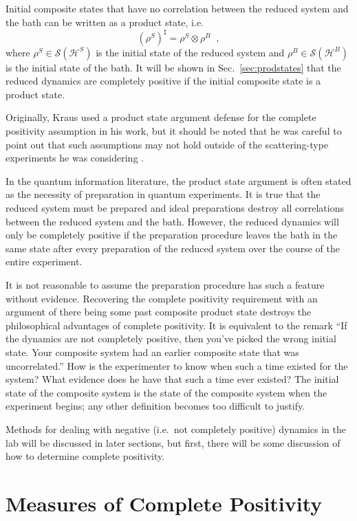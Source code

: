 Initial composite states that have no correlation between the reduced system and the bath can be written as a product state, i.e.\
\begin{equation*}
(\rho^S)^\sharp = \rho^S \otimes \rho^B\;\;,
\end{equation*}
where $\rho^S\in\mathcal{S}(\mathcal{H}^S)$ is the initial state of the reduced system and $\rho^B\in\mathcal{S}(\mathcal{H}^B)$ is the initial state of the bath.  It will be shown in Sec.\ \ref{sec:prodstates} that the reduced dynamics are completely positive if the initial composite state is a product state.  

Originally, Kraus used a product state argument defense for the complete positivity assumption in his work, but it should be noted that he was careful to point out that such assumptions may not hold outside of the scattering-type experiments he was considering \cite{Kraus1983}.  

In the quantum information literature, the product state argument is often stated as the necessity of preparation in quantum experiments.  It is true that the reduced system must be prepared and ideal preparations destroy all correlations between the reduced system and the bath.  However, the reduced dynamics will only be completely positive if the preparation procedure leaves the bath in the same state after every preparation of the reduced system over the course of the entire experiment.  

It is not reasonable to assume the preparation procedure has such a feature without evidence.  Recovering the complete positivity requirement with an argument of there being some past composite product state destroys the philosophical advantages of complete positivity. It is equivalent to the remark ``If the dynamics are not completely positive, then you've picked the wrong initial state. Your composite system had an earlier composite state that was uncorrelated.''  How is the experimenter to know when such a time existed for the system?  What evidence does he have that such a time ever existed?  The initial state of the composite system is the state of the composite system when the experiment begins; any other definition becomes too difficult to justify. 

Methods for dealing with negative (i.e.\ not completely positive) dynamics in the lab will be discussed in later sections, but first, there will be some discussion of how to determine complete positivity.

\section{Measures of Complete Positivity}

